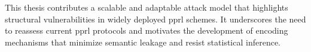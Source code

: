 This thesis contributes a scalable and adaptable attack model that highlights structural vulnerabilities in widely deployed \ac{pprl} schemes.
It underscores the need to reassess current \ac{pprl} protocols and motivates the development of encoding mechanisms that minimize semantic leakage and resist statistical inference.
